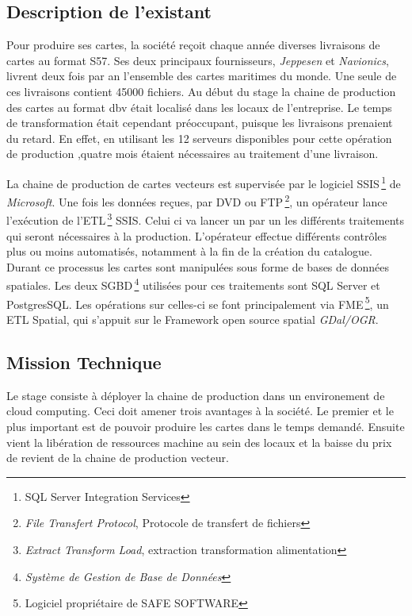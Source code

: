 
\subsection{Description de l'existant}
Pour produire ses cartes, la société \maxsea reçoit chaque année
diverses livraisons de cartes au format S57. Ses deux principaux
fournisseurs, \textit{Jeppesen} et \textit{Navionics}, livrent deux
fois par an l'ensemble des cartes maritimes du monde. Une seule de ces
livraisons contient 45000 fichiers. Au début du stage la chaine de
production des cartes au format dbv était localisé dans les locaux de
l'entreprise. Le temps de transformation était cependant préoccupant,
puisque les livraisons prenaient du retard. En effet, en utilisant les
12 serveurs disponibles pour cette opération de production ,quatre
mois étaient nécessaires au traitement d'une livraison.

La chaine de production de cartes vecteurs est supervisée par le
logiciel SSIS\,\footnote{SQL Server Integration Services} de
\textit{Microsoft}. Une fois les données reçues, par DVD ou
FTP\,\footnote{\textit{File Transfert Protocol}, Protocole de
  transfert de fichiers}, un opérateur lance l'exécution de
l'ETL\,\footnote{\textit{Extract Transform Load}, extraction
  transformation alimentation} SSIS. Celui ci va lancer un par un les
différents traitements qui seront nécessaires à la
production. L'opérateur effectue différents contrôles plus ou moins
automatisés, notamment à la fin de la création du catalogue. Durant ce
processus les cartes sont manipulées sous forme de bases de données
spatiales. Les deux SGBD\,\footnote{\textit{Système de Gestion de Base
    de Données}} utilisées pour ces traitements sont SQL Server et
PostgresSQL. Les opérations sur celles-ci se font principalement via
FME\,\footnote{Logiciel propriétaire de SAFE SOFTWARE}, un ETL
Spatial, qui s'appuit sur le Framework open source spatial
\textit{GDal/OGR}.

\subsection{Mission Technique}
Le stage consiste à déployer la chaine de production dans un
environement de cloud computing. Ceci doit amener trois avantages à la
société. Le premier et le plus important est de pouvoir produire les
cartes dans le temps demandé. Ensuite vient la libération de
ressources machine au sein des locaux et la baisse du prix de revient
de la chaine de production vecteur.





